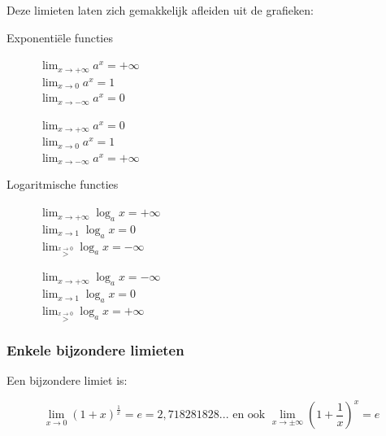 Deze limieten laten zich gemakkelijk afleiden uit de grafieken:

Exponenti\"ele functies



\begin{figure}[H]
	\centering
	
	\caption{
		$\lim_{x\to+\infty}a^{x}=+\infty$  \\
		$ \lim_{x\to0}a^{x}=1$ \\ 
		$\lim_{x\to-\infty}a^{x}=0$ 
	 }
\end{figure}
	

\begin{figure}[H]
	\centering
	
	\caption{
		$\lim_{x\to+\infty}a^{x}=0$		\\ 
		$\lim_{x\to0}a^{x}=1$ \\ 
		$\lim_{x\to-\infty}a^{x}=+\infty$
	}
\end{figure}



Logaritmische functies


\begin{figure}[H]
	\centering
	
	\caption{
${\displaystyle \lim_{x\to+\infty}}\log_{a}x=+\infty$  \\
${\displaystyle \lim_{x\to1}}\log_{a}x=0$  \\
${\displaystyle \lim_{\overset{x\rightarrow0}{>}}}\log_{a}x=-\infty$   	}
\end{figure}


\begin{figure}[H]
	\centering
	
	\caption{
${\displaystyle \lim_{x\to+\infty}}\log_{a}x=-\infty$\\
${\displaystyle \lim_{x\to1}}\log_{a}x=0$\\
${\displaystyle \lim_{\overset{x\rightarrow0}{>}}}\log_{a}x=+\infty$ 
	}
\end{figure}


\subsubsection{Enkele bijzondere limieten}
\label{sec:bijzlim}
Een bijzondere limiet is:

\begin{equation*}
\lim_{x\to0}\left(1+x\right)^{\frac{1}{x}}=e=2,718281828...
\text{ en ook } \lim_{x\to\pm\infty}\left(1+\frac{1}{x}\right)^{x}=e
\end{equation*}

